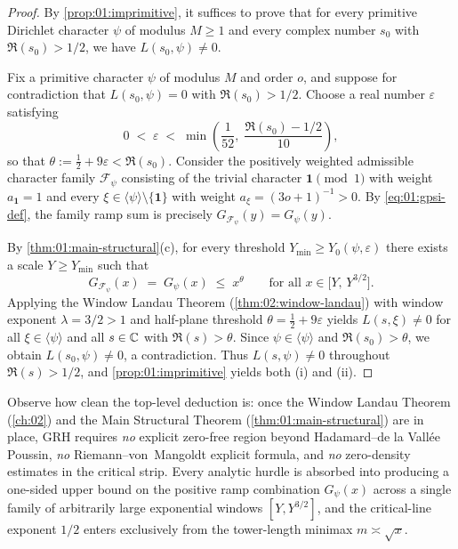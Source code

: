 \begin{proof}
By \cref{prop:01:imprimitive}, it suffices to prove that for every primitive Dirichlet character $\psi$ of modulus $M \ge 1$ and every complex number $s_0$ with $\Re(s_0) > 1/2$, we have $L(s_0, \psi) \neq 0$.

Fix a primitive character $\psi$ of modulus $M$ and order $o$, and suppose for contradiction that $L(s_0, \psi) = 0$ with $\Re(s_0) > 1/2$. Choose a real number $\varepsilon$ satisfying
\[
  0 \;<\; \varepsilon \;<\; \min\!\left(\frac{1}{52},\; \frac{\Re(s_0) - 1/2}{10}\right),
\]
so that $\theta := \frac{1}{2} + 9\varepsilon < \Re(s_0)$. Consider the positively weighted admissible character family $\mathcal{F}_\psi$ consisting of the trivial character $\mathbf{1} \pmod 1$ with weight $a_{\mathbf{1}} = 1$ and every $\xi \in \langle \psi \rangle \setminus \{\mathbf{1}\}$ with weight $a_\xi = (3o+1)^{-1} > 0$. By \eqref{eq:01:gpsi-def}, the family ramp sum is precisely $G_{\mathcal{F}_\psi}(y) = G_\psi(y)$.

By \cref{thm:01:main-structural}(c), for every threshold $Y_{\min} \ge Y_0(\psi, \varepsilon)$ there exists a scale $Y \ge Y_{\min}$ such that
\[
  G_{\mathcal{F}_\psi}(x) \;=\; G_\psi(x) \;\le\; x^{\theta} \qquad \text{for all } x \in \bigl[Y,\, Y^{3/2}\bigr].
\]
Applying the Window Landau Theorem (\cref{thm:02:window-landau}) with window exponent $\lambda = 3/2 > 1$ and half-plane threshold $\theta = \frac{1}{2} + 9\varepsilon$ yields $L(s, \xi) \neq 0$ for all $\xi \in \langle \psi \rangle$ and all $s \in \mathbb{C}$ with $\Re(s) > \theta$. Since $\psi \in \langle \psi \rangle$ and $\Re(s_0) > \theta$, we obtain $L(s_0, \psi) \neq 0$, a contradiction. Thus $L(s, \psi) \neq 0$ throughout $\Re(s) > 1/2$, and \cref{prop:01:imprimitive} yields both (i) and (ii).
\end{proof}

\begin{remark}
Observe how clean the top-level deduction is: once the Window Landau Theorem (\cref{ch:02}) and the Main Structural Theorem (\cref{thm:01:main-structural}) are in place, GRH requires \emph{no} explicit zero-free region beyond Hadamard--de la Vall\'ee Poussin, \emph{no} Riemann--von~Mangoldt explicit formula, and \emph{no} zero-density estimates in the critical strip. Every analytic hurdle is absorbed into producing a one-sided upper bound on the positive ramp combination $G_\psi(x)$ across a single family of arbitrarily large exponential windows $[Y, Y^{3/2}]$, and the critical-line exponent $1/2$ enters exclusively from the tower-length minimax $m \asymp \sqrt{x}$.
\end{remark}

